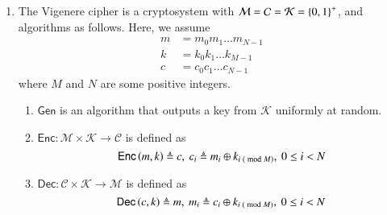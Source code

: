 \documentclass[journal,12pt,twocolumn]{IEEEtran}
\begin{document}
\begin{enumerate}
    \item The Vigenere cipher is a cryptosystem with \(\mathcal{M} = \mathcal{C}
    = \mathcal{K} = \left\{0,1\right\}^{+}\), and algorithms as follows. Here, we
    assume
        \begin{align}
            m &= m_0m_1\ldots{}m_{N-1} \label{eq:m-def} \\
            k &= k_0k_1\ldots{}k_{M-1} \label{eq:k-def} \\
            c &= c_0c_1\ldots{}c_{N-1} \label{eq:c-def}
        \end{align}
        where \(M\) and \(N\) are some positive integers.
        \begin{enumerate}
            \item \(\textsf{Gen}\) is an algorithm that outputs a key from \(\mathcal{K}\) uniformly at random.
            \item \(\textsf{Enc}: \mathcal{M}\times\mathcal{K}\rightarrow\mathcal{C}\) is defined as
                \begin{equation}
                    \textsf{Enc}\left(m,k\right) \triangleq c,\ c_i \triangleq m_i \oplus k_{i\;\left(\bmod{M}\right)},\ 0 \le i < N
                    \label{eq:vigenere-enc-def}
                \end{equation}
            \item \(\textsf{Dec}: \mathcal{C}\times\mathcal{K}\rightarrow\mathcal{M}\) is defined as
                \begin{equation}
                    \textsf{Dec}\left(c,k\right) \triangleq m,\ m_i \triangleq c_i \oplus k_{i\;\left(\bmod{M}\right)},\ 0 \le i < N
                    \label{eq:vigenere-dec-def}
                \end{equation}
        \end{enumerate}


\end{enumerate}
\end{document}
